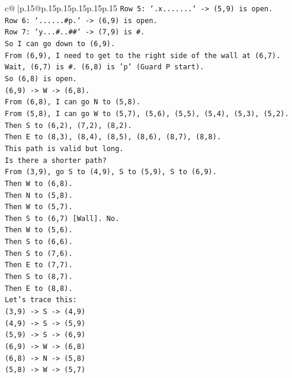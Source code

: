 \documentclass{article}
\begin{document}
{\begin{supertabular}{c@{$\;$}|p{.15\linewidth}@{}p{.15\linewidth}p{.15\linewidth}p{.15\linewidth}p{.15\linewidth}p{.15\linewidth}}
{{{\texttt{Row 5: `.x.......` {-}> (5,9) is open.} \\
\texttt{Row 6: `......\#p.` {-}> (6,9) is open.} \\
\texttt{Row 7: `y...\#..\#\#` {-}> (7,9) is \#.} \\
\texttt{So I can go down to (6,9).} \\
\texttt{From (6,9), I need to get to the right side of the wall at (6,7).} \\
\texttt{Wait, (6,7) is \#. (6,8) is 'p' (Guard P start).} \\
\texttt{So (6,8) is open.} \\
\texttt{(6,9) {-}> W {-}> (6,8).} \\
\texttt{From (6,8), I can go N to (5,8).} \\
\texttt{From (5,8), I can go W to (5,7), (5,6), (5,5), (5,4), (5,3), (5,2).} \\
\texttt{Then S to (6,2), (7,2), (8,2).} \\
\texttt{Then E to (8,3), (8,4), (8,5), (8,6), (8,7), (8,8).} \\
\texttt{This path is valid but long.} \\
\texttt{Is there a shorter path?} \\
\texttt{From (3,9), go S to (4,9), S to (5,9), S to (6,9).} \\
\texttt{Then W to (6,8).} \\
\texttt{Then N to (5,8).} \\
\texttt{Then W to (5,7).} \\
\texttt{Then S to (6,7) {[}Wall{]}. No.} \\
\texttt{Then W to (5,6).} \\
\texttt{Then S to (6,6).} \\
\texttt{Then S to (7,6).} \\
\texttt{Then E to (7,7).} \\
\texttt{Then S to (8,7).} \\
\texttt{Then E to (8,8).} \\
\texttt{Let's trace this:} \\
\texttt{(3,9) {-}> S {-}> (4,9)} \\
\texttt{(4,9) {-}> S {-}> (5,9)} \\
\texttt{(5,9) {-}> S {-}> (6,9)} \\
\texttt{(6,9) {-}> W {-}> (6,8)} \\
\texttt{(6,8) {-}> N {-}> (5,8)} \\
\texttt{(5,8) {-}> W {-}> (5,7)} \\
}}}
\end{supertabular}}
\end{document}
